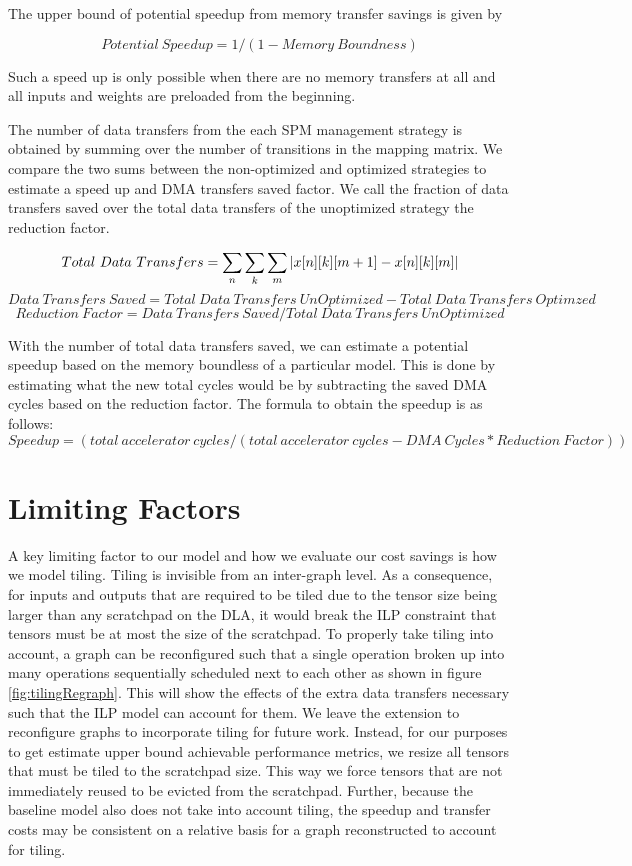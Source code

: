 The upper bound of potential speedup from memory transfer savings is given by

\[
    Potential\ Speedup = 1/(1 - Memory\ Boundness)
\]

Such a speed up is only possible when there are no memory transfers at all and all
inputs and weights are preloaded from the beginning.

%
The number of data transfers from the each SPM management strategy is obtained
by summing over the number of transitions in the mapping matrix. We compare the
two sums between the non-optimized and optimized strategies to estimate a speed
up and DMA transfers saved factor. We call the fraction of data transfers saved
over the total data transfers of the unoptimized strategy the reduction factor.

\[
	Total\ Data\ Transfers = \sum_n \sum_k \sum_m |x[n][k][m+1] - x[n][k][m]|\\
\]
\[
	Data\ Transfers\ Saved = Total\ Data\ Transfers\ UnOptimized - Total\ Data\ Transfers\ Optimzed
\]
\[
	Reduction\ Factor = Data\ Transfers\ Saved / Total\ Data\ Transfers\ UnOptimized
\]

With the number of total data transfers saved, we can estimate a potential speedup
based on the memory boundless of a particular model. This is done by estimating what
the new total cycles would be by subtracting the saved DMA cycles based on the reduction
factor. The formula to obtain the speedup is as follows:
\[
	Speedup = (total\ accelerator\ cycles / (total\ accelerator\ cycles - DMA\ Cycles *
	Reduction\ Factor))
\]

\section{Limiting Factors}
A key limiting factor to our model and how we evaluate our cost savings is how
we model tiling. Tiling is invisible from an inter-graph level. As a
consequence, for inputs and outputs that are required to be tiled due to the
tensor size being larger than any scratchpad on the DLA, it would break the ILP
constraint that tensors must be at most the size of the scratchpad.  To
properly take tiling into account, a graph can be reconfigured such that a
single operation broken up into many operations
sequentially scheduled next to each other as shown in figure \ref{fig:tilingRegraph}.
This will show the effects of the extra data transfers necessary such that the 
ILP model can account for them. We leave the extension to reconfigure graphs
to incorporate tiling for future work. Instead, for our purposes to get
estimate upper bound achievable performance metrics, we resize all tensors
that must be tiled to the scratchpad size. This way we force tensors that
are not immediately reused to be evicted from the scratchpad. Further, because
the baseline model also does not take into account tiling, the speedup and 
transfer costs may be consistent on a relative basis for a graph reconstructed
to account for tiling.


